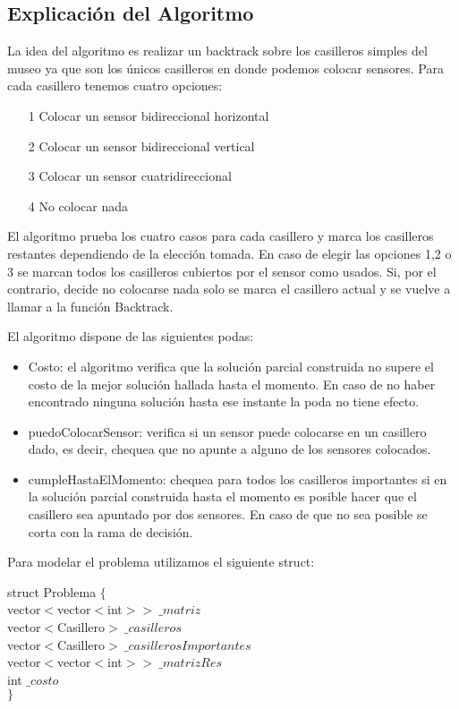 \subsection{Explicación del Algoritmo}

La idea del algoritmo es realizar un backtrack sobre los casilleros simples del museo ya que son los únicos casilleros en donde podemos colocar sensores. Para cada casillero tenemos cuatro opciones:

\begin{itemize}
\item[1] Colocar un sensor bidireccional horizontal
\item[2] Colocar un sensor bidireccional vertical
\item[3] Colocar un sensor cuatridireccional
\item[4] No colocar nada
\end{itemize}

El algoritmo prueba los cuatro casos para cada casillero y marca los casilleros restantes dependiendo de la elección tomada. En caso de elegir las opciones 1,2 o 3 se marcan todos los casilleros cubiertos por el sensor como usados. Si, por el contrario, decide no colocarse nada solo se marca el casillero actual y se vuelve a llamar a la función Backtrack.

El algoritmo dispone de las siguientes podas:

\begin{itemize}
\item Costo: el algoritmo verifica que la solución parcial construida no supere el costo de la mejor solución hallada hasta el momento. En caso de no haber encontrado ninguna solución hasta ese instante la poda no tiene efecto.
\item puedoColocarSensor: verifica si un sensor puede colocarse en un casillero dado, es decir, chequea que no apunte a alguno de los sensores colocados.
\item cumpleHastaElMomento: chequea para todos los casilleros importantes si en la solución parcial construida hasta el momento es posible hacer que el casillero sea apuntado por dos sensores. En caso de que no sea posible se corta con la rama de decisión.
\end{itemize}

Para modelar el problema utilizamos el siguiente struct:

\begin{algorithm}[H]
struct Problema $\{$ \\
	vector$<$vector$<$int$>> \ \_matriz$ \\
	vector$<$Casillero$> \ \_casilleros$ \\
	vector$<$Casillero$> \ \_casillerosImportantes$ \\
	vector$<$vector$<$int$>> \ \_matrizRes$ \\
	int $\_costo$ \\
$\}$
\end{algorithm}

